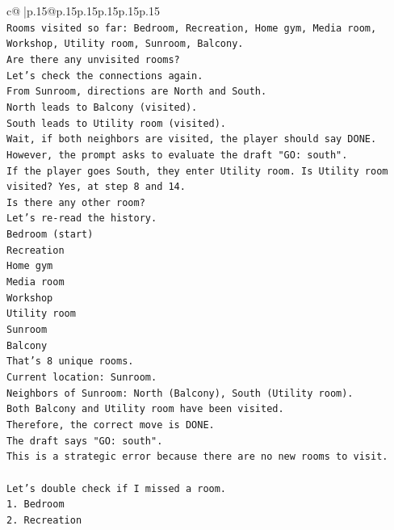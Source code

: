 \documentclass{article}
\begin{document}
{\begin{supertabular}{c@{$\;$}|p{.15\linewidth}@{}p{.15\linewidth}p{.15\linewidth}p{.15\linewidth}p{.15\linewidth}p{.15\linewidth}}
{{{\\ 
\texttt{Rooms visited so far: Bedroom, Recreation, Home gym, Media room, Workshop, Utility room, Sunroom, Balcony.} \\
\texttt{Are there any unvisited rooms?} \\
\texttt{Let's check the connections again.} \\
\texttt{From Sunroom, directions are North and South.} \\
\texttt{North leads to Balcony (visited).} \\
\texttt{South leads to Utility room (visited).} \\
\texttt{Wait, if both neighbors are visited, the player should say DONE.} \\
\texttt{However, the prompt asks to evaluate the draft "GO: south".} \\
\texttt{If the player goes South, they enter Utility room. Is Utility room visited? Yes, at step 8 and 14.} \\
\texttt{Is there any other room?} \\
\texttt{Let's re{-}read the history.} \\
\texttt{Bedroom (start)} \\
\texttt{Recreation} \\
\texttt{Home gym} \\
\texttt{Media room} \\
\texttt{Workshop} \\
\texttt{Utility room} \\
\texttt{Sunroom} \\
\texttt{Balcony} \\
\texttt{That's 8 unique rooms.} \\
\texttt{Current location: Sunroom.} \\
\texttt{Neighbors of Sunroom: North (Balcony), South (Utility room).} \\
\texttt{Both Balcony and Utility room have been visited.} \\
\texttt{Therefore, the correct move is DONE.} \\
\texttt{The draft says "GO: south".} \\
\texttt{This is a strategic error because there are no new rooms to visit.} \\
\\ 
\texttt{Let's double check if I missed a room.} \\
\texttt{1. Bedroom} \\
\texttt{2. Recreation} \\
}}}
\end{supertabular}}
\end{document}
